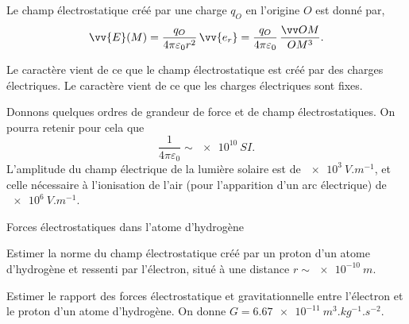 \documentclass[12pt,fancy]{cours}
\begin{document}
\begin{prop}\label{prop:}
Le champ électrostatique créé par une charge  $q_O$ en l’origine $O$ est donné par,
\begin{equation*}
\vv{E}(M)=\frac{q_O}{4\pi\varepsilon_0 r^2}\,\vv{e_r} = \frac{q_O}{4\pi\varepsilon_0}\,\frac{\Vec{OM}}{OM^3}.
\end{equation*}
\end{prop}

\begin{remarque}
  Le caractère  vient de ce que le champ électrostatique est créé par des charges électriques.  
  Le caractère  vient de ce que les charges électriques sont fixes. 
  
\end{remarque}
Donnons quelques ordres de grandeur de force et de champ électrostatiques. On pourra retenir pour cela  que
\begin{equation}
\frac{1}{4\pi\varepsilon_0}\sim \SI{e10}{SI}.
\end{equation}
L'amplitude du champ électrique de la lumière solaire est de $\SI{e3}{V.m^{-1}}$, et celle nécessaire à l'ionisation de l'air (pour l'apparition d'un arc électrique) de $\SI{e6}{V.m^{-1}}$.
\begin{exemple}{Forces électrostatiques dans l’atome d’hydrogène} 
  \begin{quest}
    \item Estimer la norme du champ électrostatique créé par un proton d’un atome d’hydrogène et ressenti par l'électron, situé à une distance $r\sim\SI{e-10}{m}$.
    \item Estimer le rapport des forces électrostatique et gravitationnelle entre l'électron et le proton d'un atome d’hydrogène. On donne $G = \SI{6,67e-11}{m^{3}.kg^{-1}.s^{-2}}$.
  \end{quest}
\end{exemple}
\end{document}
